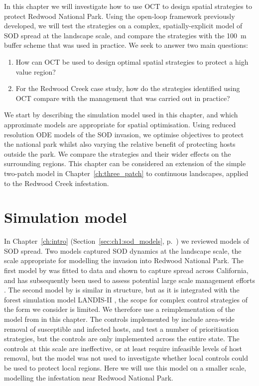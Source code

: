 In this chapter we will investigate how to use OCT to design spatial strategies to protect Redwood National Park. Using the open-loop framework previously developed, we will test the strategies on a complex, spatially-explicit model of SOD spread at the landscape scale, and compare the strategies with the \SI{100}{\meter} buffer scheme that was used in practice. We seek to answer two main questions:
\begin{enumerate}
    \item How can OCT be used to design optimal spatial strategies to protect a high value region?
    \item For the Redwood Creek case study, how do the strategies identified using OCT compare with the management that was carried out in practice?
\end{enumerate}

We start by describing the simulation model used in this chapter, and which approximate models are appropriate for spatial optimisation. Using reduced resolution ODE models of the SOD invasion, we optimise objectives to protect the national park whilst also varying the relative benefit of protecting hosts outside the park. We compare the strategies and their wider effects on the surrounding regions. This chapter can be considered an extension of the simple two-patch model in Chapter~\ref{ch:three_patch} to continuous landscapes, applied to the Redwood Creek infestation.

\section{Simulation model}

In Chapter~\ref{ch:intro} (Section~\ref{sec:ch1:sod_models}, p.~\pageref{sec:ch1:sod_models}) we reviewed models of SOD spread. Two models captured SOD dynamics at the landscape scale, the scale appropriate for modelling the invasion into Redwood National Park. The first model by \citet{meentemeyer_epidemiological_2011} was fitted to data and shown to capture spread across California, and has subsequently been used to assess potential large scale management efforts \citep{cunniffe_modelling_2016}. The second model by \citet{tonini_modeling_2018} is similar in structure, but as it is integrated with the forest simulation model LANDIS-II \citep{scheller_design_2007}, the scope for complex control strategies of the form we consider is limited. We therefore use a reimplementation of the model from \citet{meentemeyer_epidemiological_2011} in this chapter. The controls implemented by \citet{cunniffe_modelling_2016} include area-wide removal of susceptible and infected hosts, and test a number of prioritisation strategies, but the controls are only implemented across the entire state. The controls at this scale are ineffective, or at least require infeasible levels of host removal, but the model was not used to investigate whether local controls could be used to protect local regions. Here we will use this model on a smaller scale, modelling the infestation near Redwood National Park.

